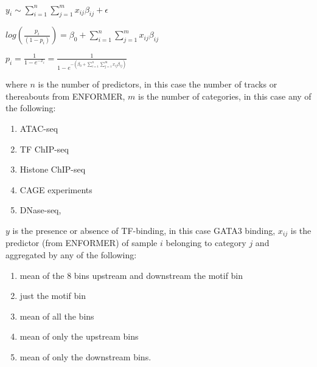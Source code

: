 \documentclass[
  letterpaper,
  DIV=11,
  numbers=noendperiod]{scrartcl}
\providecommand{\tightlist}{%
  \setlength{\itemsep}{0pt}\setlength{\parskip}{0pt}}\usepackage{longtable,booktabs,array}
\begin{document}
\(y_{i} \sim \sum_{i=1}^{n}\sum_{j=1}^{m}x_{ij}\beta_{ij} + \epsilon\)

\(log(\frac{p_{i}}{(1-p_{i})}) = \beta_{0} + \sum_{i=1}^{n}\sum_{j=1}^{m}x_{ij}\beta_{ij}\)

\(p_{i} = \frac{1}{1-e^{-x_{i}}} = \frac{1}{1-e^{-(\beta_{0} + \sum_{i=1}^{n}\sum_{j=1}^{m}x_{ij}\beta_{ij})}}\)

where \(n\) is the number of predictors, in this case the number of
tracks or thereabouts from ENFORMER, \(m\) is the number of categories,
in this case any of the following:

\begin{enumerate}
\def\labelenumi{\arabic{enumi}.}
\tightlist
\item
  ATAC-seq
\item
  TF ChIP-seq
\item
  Histone ChIP-seq
\item
  CAGE experiments
\item
  DNase-seq,
\end{enumerate}

\(y\) is the presence or absence of TF-binding, in this case GATA3
binding, \(x_{ij}\) is the predictor (from ENFORMER) of sample \(i\)
belonging to category \(j\) and aggregated by any of the following:

\begin{enumerate}
\def\labelenumi{\arabic{enumi}.}
\tightlist
\item
  mean of the 8 bins upstream and downstream the motif bin
\item
  just the motif bin
\item
  mean of all the bins
\item
  mean of only the upstream bins
\item
  mean of only the downstream bins.
\end{enumerate}
\end{document}
